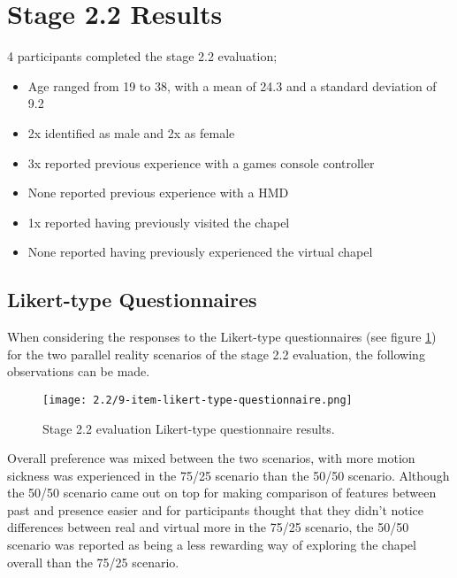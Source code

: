 
\section{Stage 2.2 Results}

4 participants completed the stage 2.2 evaluation;
\begin{itemize}
	\item Age ranged from 19 to 38, with a mean of 24.3 and a standard deviation of 9.2
	\item 2x identified as male and 2x as female
	\item 3x reported previous experience with a games console controller
	\item None reported previous experience with a HMD
	\item 1x reported having previously visited the chapel
	\item None reported having previously experienced the virtual chapel
\end{itemize}


\subsection{Likert-type Questionnaires}

When considering the responses to the Likert-type questionnaires (see figure \ref{9-item-likert-type-questionnaire.png}) for the two parallel reality scenarios of the stage 2.2 evaluation, the following observations can be made.

\begin{figure}[h]
	\begin{center}
	\texttt{[image: 2.2/9-item-likert-type-questionnaire.png]}
	\caption{Stage 2.2 evaluation Likert-type questionnaire results.}
	\label{9-item-likert-type-questionnaire.png}
	\end{center}
\end{figure}

Overall preference was mixed between the two scenarios, with more motion sickness was experienced in the 75/25 scenario than the 50/50 scenario. Although the 50/50 scenario came out on top for making comparison of features between past and presence easier and for participants thought that they didn't notice differences between real and virtual more in the 75/25 scenario, the 50/50 scenario was reported as being a less rewarding way of exploring the chapel overall than the 75/25 scenario.

